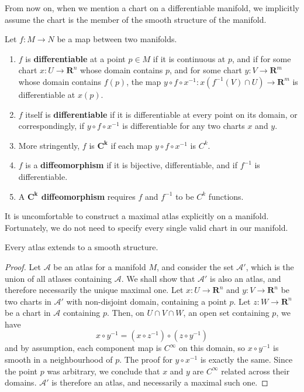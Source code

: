 From now on, when we mention a chart on a differentiable manifold, we implicitly assume the chart is the member of the smooth structure of the manifold.

\begin{definition}
    Let $f:M \to N$ be a map between two manifolds.
    \begin{enumerate}
        \item $f$ is {\bf differentiable} at a point $p \in M$ if it is continuous at $p$, and if for some chart $x:U \to \mathbf{R}^n$ whose domain contains $p$, and for some chart $y:V \to \mathbf{R}^m$ whose domain contains $f(p)$, the map $y \circ f \circ x^{-1}:x(f^{-1}(V) \cap U) \to \mathbf{R}^m$ is differentiable at $x(p)$.
        \item $f$ itself is {\bf differentiable} if it is differentiable at every point on its domain, or correspondingly, if $y \circ f \circ x^{-1}$ is differentiable for any two charts $x$ and $y$.
        \item More stringently, $f$ is $\mathbf{C^k}$ if each map $y \circ f \circ x^{-1}$ is $C^k$.
        \item $f$ is a {\bf diffeomorphism} if it is bijective, differentiable, and if $f^{-1}$ is differentiable.
        \item A {\bf $\mathbf{C^k}$ diffeomorphism} requires $f$ and $f^{-1}$ to be $C^k$ functions.
    \end{enumerate}
\end{definition}

It is uncomfortable to construct a maximal atlas explicitly on a manifold. Fortunately, we do not need to specify every single valid chart in our manifold.

\begin{lemma}
    Every atlas extends to a smooth structure.
\end{lemma}
\begin{proof}
Let $\mathcal{A}$ be an atlas for a manifold $M$, and consider the set $\mathcal{A}'$, which is the union of all atlases containing $\mathcal{A}$. We shall show that $\mathcal{A}'$ is also an atlas, and therefore necessarily the unique maximal one. Let $x:U \to \mathbf{R}^n$ and $y:V \to \mathbf{R}^n$ be two charts in $\mathcal{A}'$ with non-disjoint domain, containing a point $p$. Let $z:W \to \mathbf{R}^n$ be a chart in $\mathcal{A}$ containing $p$. Then, on $U \cap V \cap W$, an open set containing $p$, we have
%
\[ x \circ y^{-1} = (x \circ z^{-1}) \circ (z \circ y^{-1}) \]
%
and by assumption, each component map is $C^\infty$ on this domain, so $x \circ y^{-1}$ is smooth in a neighbourhood of $p$. The proof for $y \circ x^{-1}$ is exactly the same. Since the point $p$ was arbitrary, we conclude that $x$ and $y$ are $C^\infty$ related across their domains. $\mathcal{A}'$ is therefore an atlas, and necessarily a maximal such one.
\end{proof}

